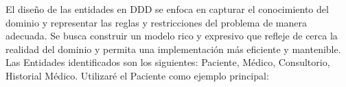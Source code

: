 El diseño de las entidades en DDD se enfoca en capturar el conocimiento del dominio y representar las reglas y 
restricciones del problema de manera adecuada. Se busca construir un modelo rico y expresivo que refleje de cerca 
la realidad del dominio y permita una implementación más eficiente y mantenible.
Las Entidades identificados son los siguientes: Paciente, Médico, Consultorio, Historial Médico.
Utilizaré el Paciente como ejemplo principal:  

  

